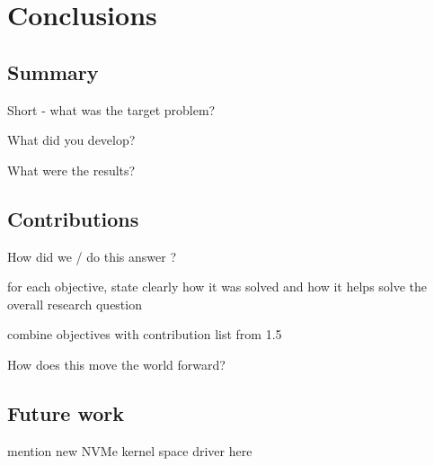 \chapter{Conclusions}\label{chapter:conclusion}
\section{Summary}

Short - what was the target problem?


What did you develop?

What were the results?


\section{Contributions}\label{sec:concl}



How did we / do this answer ?

for each objective, state clearly how it was solved and how it helps solve the overall research question

combine objectives with contribution list from 1.5

How does this move the world forward?

\section{Future work}\label{sec:fw}
mention new NVMe kernel space driver here

